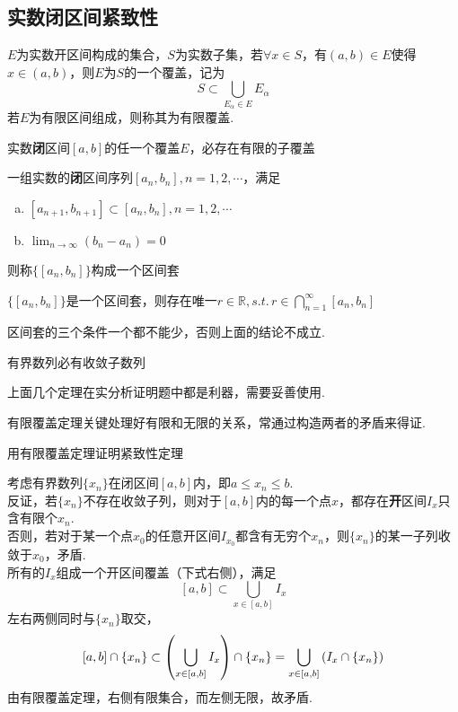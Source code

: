 \subsection{实数闭区间紧致性}
\begin{definition}[覆盖]
$E$为实数开区间构成的集合，$S$为实数子集，若$\forall x\in S$，有$(a,b)\in E$使得$x\in(a,b)$，则$E$为$S$的一个覆盖，记为
\[S\subset\bigcup_{E_\alpha\in E}E_\alpha\]
若$E$为有限区间组成，则称其为有限覆盖.
\end{definition}
\begin{theorem}
实数\textbf{闭}区间$[a,b]$的任一个覆盖$E$，必存在有限的子覆盖
\end{theorem}
\begin{definition}[区间套]
一组实数的\textbf{闭}区间序列$[a_n,b_n],n=1,2,\cdots$，满足
\begin{enumerate}[a.]
	\item $[a_{n+1},b_{n+1}]\subset[a_n,b_n],n=1,2,\cdots$
	\item $\displaystyle\lim_{n\to\infty}(b_n-a_n)=0$
\end{enumerate}
则称$\{[a_n,b_n]\}$构成一个区间套
\end{definition}
\begin{theorem}[区间套定理]
$\{[a_n,b_n]\}$是一个区间套，则存在唯一$\displaystyle r\in\mathbb{R},s.t.\,r\in\bigcap_{n=1}^{\infty}[a_n,b_n]$
\end{theorem}
\par 区间套的三个条件一个都不能少，否则上面的结论不成立.
\begin{theorem}
有界数列必有收敛子数列
\end{theorem}
\par 上面几个定理在实分析证明题中都是利器，需要妥善使用.
\par 有限覆盖定理关键处理好有限和无限的关系，常通过构造两者的矛盾来得证.
\begin{example}
用有限覆盖定理证明紧致性定理
\end{example}
\begin{analysis}
考虑有界数列$\{x_n\}$在闭区间$[a,b]$内，即$a\leq x_n\leq b$.\\
反证，若$\{x_n\}$不存在收敛子列，则对于$[a,b]$内的每一个点$x$，都存在\textbf{开}区间$I_x$只含有限个$x_n$.\\
否则，若对于某一个点$x_0$的任意开区间$I_{x_0}$都含有无穷个$x_n$，则$\{x_n\}$的某一子列收敛于$x_0$，矛盾.\\
所有的$I_x$组成一个开区间覆盖（下式右侧），满足
\[[a,b]\subset\bigcup_{x\in[a,b]}I_x\]
左右两侧同时与$\{x_n\}$取交，
\[[a,b]\cap\{x_n\}\subset\left(\bigcup_{x\in[a,b]}I_x\right)\cap\{x_n\}=\bigcup_{x\in[a,b]}\left(I_x\cap\{x_n\}\right)\]
由有限覆盖定理，右侧有限集合，而左侧无限，故矛盾.
\end{analysis}
